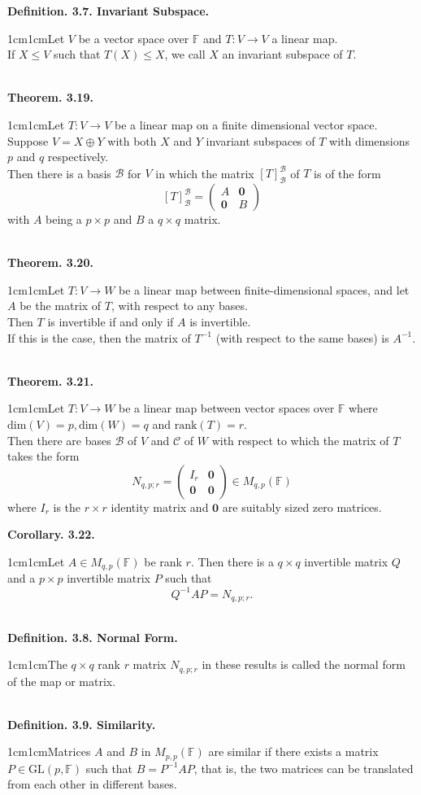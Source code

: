 \documentclass{article}
\newcommand{\vect}[1]{\mathbf{#1}}
\newcommand{\definition}[2]{\textbf{Definition. #1.}\begin{adjustwidth}{1cm}{1cm}#2\end{adjustwidth}}
\newcommand{\theorem}[2]{\textbf{Theorem. #1.}\begin{adjustwidth}{1cm}{1cm}#2\end{adjustwidth}}
\newcommand{\corollary}[2]{\textbf{Corollary. #1.}\begin{adjustwidth}{1cm}{1cm}#2\end{adjustwidth}}
\begin{document}
\definition{3.7. Invariant Subspace}{Let $V$ be a vector space over $\mathbb{F}$ and $T: V \rightarrow V$ a linear map.\\If $X \leq V$ such that $T(X) \leq X$, we call $X$ an invariant subspace of $T$.}~\\
\theorem{3.19}{Let $T: V \rightarrow V$ be a linear map on a finite dimensional vector space. Suppose $V = X \oplus Y$ with both $X$ and $Y$ invariant subspaces of $T$ with dimensions $p$ and $q$ respectively.\\Then there is a basis $\mathcal{B}$ for $V$ in which the matrix $[T]^\mathcal{B}_\mathcal{B}$ of $T$ is of the form \[[T]^\mathcal{B}_\mathcal{B} = \begin{pmatrix} A & \vect{0} \\ \vect{0} & B \end{pmatrix}\]with $A$ being a $p \times p$ and $B$ a $q \times q$ matrix.}~\\
\theorem{3.20}{Let $T : V \rightarrow W$ be a linear map between finite-dimensional spaces, and let $A$ be the matrix of $T$, with respect to any bases.\\Then $T$ is invertible if and only if $A$ is invertible.\\If this is the case, then the matrix of $T^{-1}$ (with respect to the same bases) is $A^{-1}$.}~\\
\theorem{3.21}{Let $T: V \rightarrow W$ be a linear map between vector spaces over $\mathbb{F}$ where $\text{dim}(V) = p, \text{dim}(W) = q$ and $\text{rank}(T) = r$.\\Then there are bases $\mathcal{B}$ of $V$ and $\mathcal{C}$ of $W$ with respect to which the matrix of $T$ takes the form \[N_{q,p;r} = \begin{pmatrix} I_r & \vect{0} \\ \vect{0} & \vect{0} \end{pmatrix} \in M_{q,p} (\mathbb{F})\]where $I_r$ is the $r \times r$ identity matrix and $\vect{0}$ are suitably sized zero matrices.}\newpage
\corollary{3.22}{Let $A \in M_{q,p}(\mathbb{F})$ be rank $r$. Then there is a $q \times q$ invertible matrix $Q$ and a $p \times p$ invertible matrix $P$ such that \[Q^{-1}AP = N_{q,p;r}.\]}~\\
\definition{3.8. Normal Form}{The $q \times q$ rank $r$ matrix $N_{q,p;r}$ in these results is called the normal form of the map or matrix.}~\\
\definition{3.9. Similarity}{Matrices $A$ and $B$ in $M_{p,p}(\mathbb{F})$ are similar if there exists a matrix $P \in \text{GL}(p, \mathbb{F})$ such that $B = P^{-1}AP$, that is, the two matrices can be translated from each other in different bases.}~\\
\end{document}
